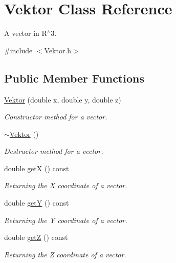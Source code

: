\hypertarget{class_vektor}{}\section{Vektor Class Reference}
\label{class_vektor}


A vector in R$^\wedge$3.  




{\ttfamily \#include $<$Vektor.\+h$>$}

\subsection*{Public Member Functions}
\begin{DoxyCompactItemize}
\item 
\mbox{\label{class_vektor_a744b4980d331af082c08890ff2e4a857}} 
\hyperlink{class_vektor_a744b4980d331af082c08890ff2e4a857}{Vektor} (double x, double y, double z)
\begin{DoxyCompactList}\small\item\em Constructor method for a vector. \end{DoxyCompactList}\item 
\mbox{\label{class_vektor_a66e8e932c4e2df23b5a1d4c4764ce9d2}} 
\hyperlink{class_vektor_a66e8e932c4e2df23b5a1d4c4764ce9d2}{$\sim$\+Vektor} ()
\begin{DoxyCompactList}\small\item\em Destructor method for a vector. \end{DoxyCompactList}\item 
double \hyperlink{class_vektor_ad1864a78b96956dc7f504bba9b39af45}{getX} () const
\begin{DoxyCompactList}\small\item\em Returning the X coordinate of a vector. \end{DoxyCompactList}\item 
double \hyperlink{class_vektor_a93d6584667064c7e3abc9d42b529db93}{getY} () const
\begin{DoxyCompactList}\small\item\em Returning the Y coordinate of a vector. \end{DoxyCompactList}\item 
double \hyperlink{class_vektor_aaef4681c5b2ce1348685eb4cd89bd9b2}{getZ} () const
\begin{DoxyCompactList}\small\item\em Returning the Z coordinate of a vector. \end{DoxyCompactList}\item 

\end{DoxyCompactItemize}
